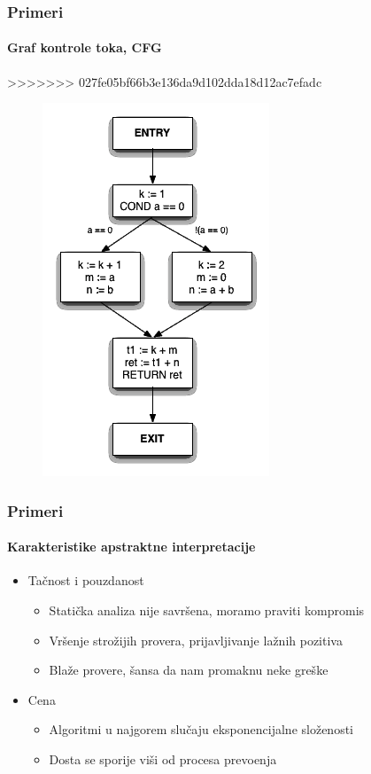 \documentclass[xetex,mathserif,serif]{beamer}
\begin{document}
  \begin{frame}
    \frametitle{Primeri}
    \framesubtitle{Graf kontrole toka, CFG}
>>>>>>> 027fe05bf66b3e136da9d102dda18d12ac7efadc
    \begin{figure}
		\begin{center}
		\includegraphics[scale=0.5]{Treehydra-cfg.png}
		\end{center}
	\end{figure}
  \end{frame}
  \begin{frame}
    \frametitle{Primeri}
    \framesubtitle{Karakteristike apstraktne interpretacije}
	\begin{center}
		\begin{itemize}
			\item Ta\v cnost i pouzdanost
				\begin{itemize}
					\item Stati\v cka analiza nije savr\v sena, moramo praviti kompromis
					\item Vr\v senje stro\v zijih provera, prijavljivanje la\v znih pozitiva
					\item Bla\v ze provere, \v sansa da nam promaknu neke gre\v ske
				\end{itemize}
			\item Cena
				\begin{itemize}
					\item Algoritmi u najgorem slu\v caju eksponencijalne slo\v zenosti
					\item Dosta se sporije vi\v si od procesa prevo\dj{}enja
				\end{itemize}
		\end{itemize}
	\end{center}
  \end{frame}
  
\end{document}
